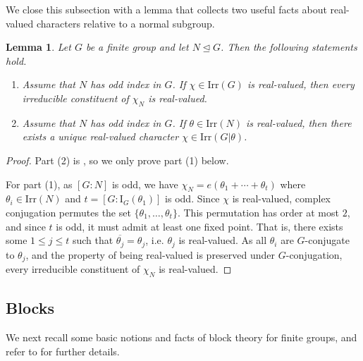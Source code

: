 \documentclass[10pt]{article}
\newtheorem{lem}{\bf Lemma}[section]
\begin{document}
We close this subsection with a lemma that collects two useful facts about real-valued characters relative to a normal subgroup. 





\begin{lem}\label{lem: real chars}
Let $G$ be a finite group and let $N \unlhd G$. Then the following statements hold.
\begin{enumerate}[\rm (1)]
    \item Assume that $N$ has odd index in $G$. 
    If $\chi \in \mathrm{Irr}(G)$ is real-valued, then every irreducible constituent of $\chi_N$ is real-valued.
    \item Assume that $N$ has odd index in $G$. 
    If $\theta \in \mathrm{Irr}(N)$ is real-valued, then there exists a unique real-valued character $\chi \in \mathrm{Irr}(G|\theta)$.
\end{enumerate}
\end{lem}
\begin{proof}
  Part (2) is \cite[Corollary 6.6(b)]{navarro18},
  so we only prove part (1) below.

   For part (1), as $[G:N]$ is odd,
   we have $\chi_N=e(\theta_1+\cdots +\theta_t)$ where $\theta_i\in \mathrm{Irr}(N)$ and $t=[G:\mathrm{I}_{G}(\theta_1)]$ is odd.
  Since $\chi$ is real-valued, complex conjugation permutes the set $\{\theta_1, \dots, \theta_t\}$. 
  This permutation has order at most $2$, and since $t$ is odd, it must admit at least one fixed point. 
That is, there exists some $1\leq j\leq t$ such that $\overline{\theta_j} = \theta_j$, i.e. $\theta_j$ is real-valued.
As all $\theta_i$ are $G$-conjugate to $\theta_j$, and the property of being real-valued is preserved under $G$-conjugation, every irreducible constituent of $\chi_N$ is real-valued.
\end{proof}








\subsection{Blocks}


We next recall some basic notions and facts of block theory for finite groups, and refer to \cite{nagao89, navarro98} for further details.
\end{document}
